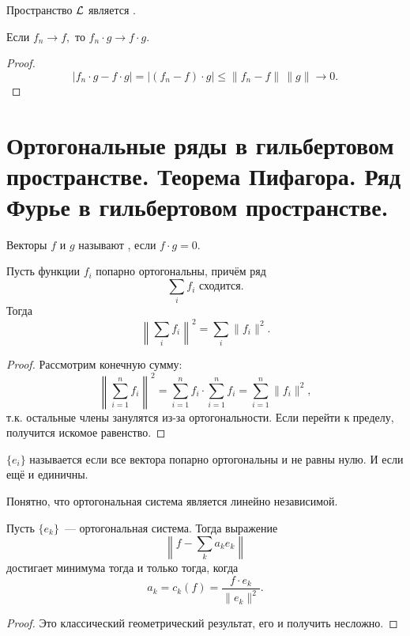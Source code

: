 \documentclass{notes}
\begin{document}
	\begin{st}
		Пространство $\mathcal{L}$ является .
	\end{st}

	\begin{st}
		Если $f_n \to f,$ то $f_n \cdot g \to f \cdot g$.
		\begin{proof}
			\[
				|f_n \cdot g - f \cdot g| = |(f_n - f) \cdot g| \leqslant \|f_n - f\| \, \|g\| \to 0.
			\]
		\end{proof}
	\end{st}

\section{Ортогональные ряды в гильбертовом пространстве. Теорема Пифагора. Ряд Фурье в гильбертовом пространстве.}

	\begin{de}
		Векторы $f$ и $g$ называют , если $f \cdot g = 0$.
	\end{de}

	\begin{thm}[Пифагора]
		Пусть функции $f_i$ попарно ортогональны, причём ряд
		\[
			\sum\limits_i f_i \text{ сходится.}
		\]
		Тогда
		\[
			\left\|\sum\limits_i f_i\right\|^2 = \sum\limits_{i} \|f_i\|^2.
		\]
		\begin{proof}
			Рассмотрим конечную сумму:
			\[
				\left\|\sum\limits_{i = 1}^n f_i\right\|^2 = \sum\limits_{i = 1}^n f_i \cdot \sum\limits_{i = 1}^n f_i = \sum\limits_{i = 1}^n \|f_i\|^2,
			\]
			т.к. остальные члены занулятся из-за ортогональности. Если перейти к пределу, получится искомое равенство.
		\end{proof}
	\end{thm}

	\begin{de}
		$\{e_i\}$ называется  если все вектора попарно ортогональны и не равны нулю. И  если ещё и единичны.
	\end{de}

	Понятно, что ортогональная система является линейно независимой.

	\begin{st}
		Пусть $\{e_k\}$~--- ортогональная система. Тогда выражение
		\[
			\left\| f - \sum\limits_{k} a_k e_k\right\|
		\]
		достигает минимума тогда и только тогда, когда
		\[
			a_k = c_k(f) = \dfrac{f \cdot e_k}{\|e_k\|^2}.
		\]
		\begin{proof}
			Это классический геометрический результат, его и получить несложно.
		\end{proof}
	\end{st}
\end{document}
